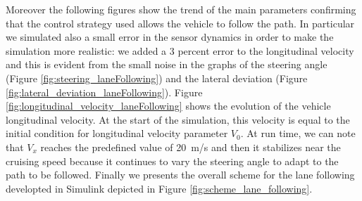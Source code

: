 Moreover the following figures show the trend of the main parameters confirming that the control strategy used allows the vehicle to follow the path. In particular we simulated also a small error in the sensor dynamics in order to make the simulation more realistic: we added a 3 percent error to the longitudinal velocity and this is evident from the small noise in the graphs of the steering angle (Figure \ref{fig:steering_laneFollowing}) and the lateral deviation (Figure \ref{fig:lateral_deviation_laneFollowing}).
Figure {\ref{fig:longitudinal_velocity_laneFollowing}} shows the evolution of the vehicle longitudinal velocity. At the start of the simulation, this velocity is equal to the initial condition for longitudinal velocity parameter $V_0$. At run time, we can note that $V_x$ reaches the predefined value of \SI{20}{m/s} and then it stabilizes near the cruising speed because it continues to vary the steering angle to adapt to the path to be followed. Finally we presents the overall scheme for the lane following developted in Simulink depicted in Figure \ref{fig:scheme_lane_following}.
